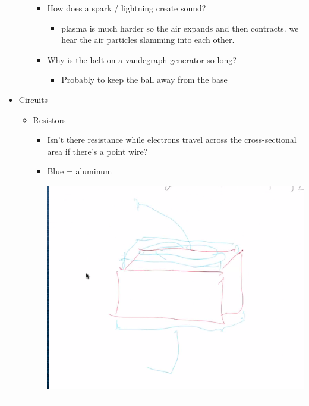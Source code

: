 \documentclass[letterpaper]{article}
\begin{document}
\begin{itemize}
\begin{itemize}
\begin{itemize}
\item How does a spark / lightning create sound?

\begin{itemize}
\item plasma is much harder so the air expands and then contracts. we
hear the air particles slamming into each other.
\end{itemize}

\item Why is the belt on a vandegraph generator so long?

\begin{itemize}
\item Probably to keep the ball away from the base
\end{itemize}
\end{itemize}
\end{itemize}

\item Circuits

\begin{itemize}
\item Resistors

\begin{itemize}
\item Isn't there resistance while electrons travel across the
cross-sectional area if there's a point wire?
\item Blue = aluminum
\begin{center}
\includegraphics[width=.9\linewidth]{KBe20phys201srcResistorCrosssectionalArea.png}
\end{center}
\end{itemize}
\end{itemize}
\end{itemize}

\noindent\rule{\textwidth}{0.5pt}
\end{document}
